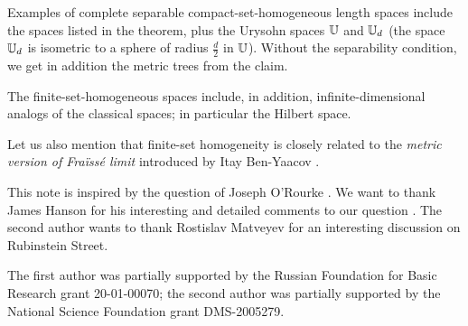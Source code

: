 \documentclass[a4paper,10pt]{article}
\begin{document}
Examples of complete separable compact-set-homogeneous length spaces include the spaces listed in the theorem,
plus the Urysohn spaces $\mathbb{U}$ and $\mathbb{U}_d$ (the space $\mathbb{U}_d$ is isometric to a sphere of radius $\tfrac d2$ in $\mathbb{U}$).
Without the separability condition, we get in addition the metric trees from the claim.

The finite-set-homogeneous spaces include, in addition, infinite-dimensional analogs of the classical spaces;
in particular the Hilbert space.  

Let us also mention that finite-set homogeneity is closely related to the \emph{metric version of Fraïssé limit} introduced by Itay Ben-Yaacov \cite{ben-yaacov}. 

This note is inspired by the question of Joseph O'Rourke \cite{rourke}.
We want to thank James Hanson for his interesting and detailed comments to our question \cite{hanson}.
The second author wants to thank Rostislav Matveyev for an interesting discussion on Rubinstein Street. 

The first author was partially supported by the Russian Foundation for Basic Research grant 20-01-00070; the second author was partially supported by the National Science Foundation grant DMS-2005279.

{\sloppy
\printbibliography[heading=bibintoc]
\fussy
}
\end{document}
